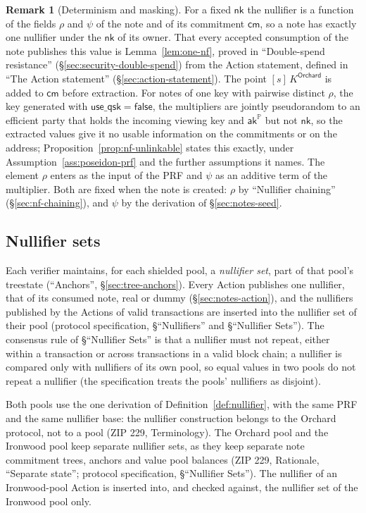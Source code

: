 \documentclass[11pt,a4paper]{article}
\theoremstyle{definition}
\newtheorem{remark}[theorem]{Remark}
\newcommand{\PP}{\mathbb{P}}
\newcommand{\cmsym}{\mathsf{cm}}
\newcommand{\aksym}{\ensuremath{\mathsf{ak}}}
\newcommand{\nksym}{\ensuremath{\mathsf{nk}}}
\begin{document}
\begin{remark}[Determinism and masking]
For a fixed $\nksym$ the nullifier is a function of the fields $\rho$ and
$\psi$ of the note and of its commitment $\cmsym$, so a note has exactly one
nullifier under the $\nksym$ of its owner. That every accepted consumption of
the note publishes this value is Lemma~\ref{lem:one-nf}, proved in
``Double-spend resistance'' (\S\ref{sec:security-double-spend}) from the
Action statement, defined in ``The Action statement''
(\S\ref{sec:action-statement}). The point $[s]\,K^{\mathsf{Orchard}}$ is
added to $\cmsym$ before extraction. For notes of one key with pairwise
distinct $\rho$, the key generated with $\mathsf{use\_qsk} = \mathsf{false}$,
the multipliers are jointly pseudorandom to an efficient party that holds the
incoming viewing key and $\aksym^{\PP}$ but not $\nksym$, so the extracted
values give it no usable information on the commitments or on the address;
Proposition~\ref{prop:nf-unlinkable} states this exactly, under
Assumption~\ref{ass:poseidon-prf} and the further assumptions it names. The
element $\rho$ enters as the input of the PRF and $\psi$ as an additive term
of the multiplier. Both are fixed when the note is created: $\rho$ by
``Nullifier chaining'' (\S\ref{sec:nf-chaining}), and $\psi$ by the
derivation of \S\ref{sec:notes-seed}.
\end{remark}

\subsection{Nullifier sets}\label{sec:nf-sets}

Each verifier maintains, for each shielded pool, a \emph{nullifier set},
part of that pool's treestate (``Anchors'', \S\ref{sec:tree-anchors}). Every
Action publishes one nullifier, that of its consumed note, real or dummy
(\S\ref{sec:notes-action}), and the nullifiers published by the Actions of
valid transactions are inserted into the nullifier set of their pool
(protocol specification, \S``Nullifiers'' and \S``Nullifier Sets''). The
consensus rule of \S``Nullifier Sets'' is that a nullifier must not repeat,
either within a transaction or across transactions in a valid block chain;
a nullifier is compared only with nullifiers of its own pool, so equal values
in two pools do not repeat a nullifier (the specification treats the pools'
nullifiers as disjoint).

Both pools use the one derivation of Definition~\ref{def:nullifier}, with
the same PRF and the same nullifier base: the nullifier construction belongs
to the Orchard protocol, not to a pool (ZIP 229, Terminology). The Orchard
pool and the Ironwood pool keep separate nullifier sets, as they keep
separate note commitment trees, anchors and value pool balances (ZIP 229,
Rationale, ``Separate state''; protocol specification, \S``Nullifier
Sets''). The nullifier of an Ironwood-pool Action is inserted into, and
checked against, the nullifier set of the Ironwood pool only.
\end{document}

